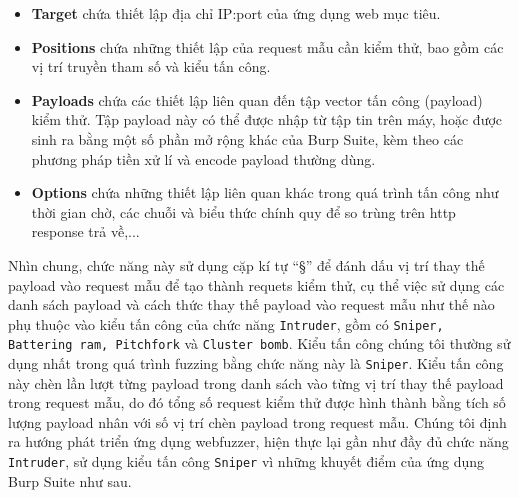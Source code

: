 \begin{itemize}
    \item \textbf{Target} chứa thiết lập địa chỉ IP:port của ứng dụng web mục tiêu.
    \item \textbf{Positions} chứa những thiết lập của request mẫu cần kiểm thử, bao gồm các vị trí truyền tham số và kiểu tấn công.
    \item \textbf{Payloads} chứa các thiết lập liên quan đến tập vector tấn công (payload) kiểm thử. Tập payload này có thể được nhập từ tập tin trên máy, hoặc được sinh ra bằng một số phần mở rộng khác của Burp Suite, kèm theo các phương pháp tiền xử lí và encode payload thường dùng.
    \item \textbf{Options} chứa những thiết lập liên quan khác trong quá trình tấn công như thời gian chờ, các chuỗi và biểu thức chính quy để so trùng trên \acrshort{http} response trả về,...
\end{itemize}
Nhìn chung, chức năng này sử dụng cặp kí tự ``§'' để đánh dấu vị trí thay thế payload vào request mẫu để tạo thành requets kiểm thử, cụ thể việc sử dụng các danh sách payload và cách thức thay thế payload vào request mẫu như thế nào phụ thuộc vào kiểu tấn công của chức năng \texttt{Intruder}, gồm có \texttt{Sniper, Battering ram, Pitchfork} và \texttt{Cluster bomb}. Kiểu tấn công chúng tôi thường sử dụng nhất trong quá trình fuzzing bằng chức năng này là \texttt{Sniper}. Kiểu tấn công này chèn lần lượt từng payload trong danh sách vào từng vị trí thay thế payload trong request mẫu, do đó tổng số request kiểm thử được hình thành bằng tích số lượng payload nhân với số vị trí chèn payload trong request mẫu. Chúng tôi định ra hướng phát triển ứng dụng webfuzzer, hiện thực lại gần như đầy đủ chức năng \texttt{Intruder}, sử dụng kiểu tấn công \texttt{Sniper} vì những khuyết điểm của ứng dụng Burp Suite như sau.
